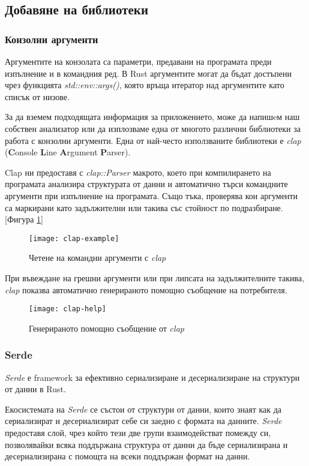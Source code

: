\subsection{Добавяне на библиотеки}

\subsubsection{Конзолни аргументи}
Аргументите на конзолата са параметри, предавани на програмата преди изпълнение
и в командния ред. В Rust аргументите могат да бъдат достъпени чрез
функцията \textit{std::env::args()}, която връща итератор над аргументите като списък от
низове.

За да вземем подходящата информация за приложението, може да напишeм наш собствен
анализатор или да изплозваме една от многото различни библиотеки за работа с
конзолни аргументи. Една от най-често използваните библиотеки е \textit{clap} (\textbf{C}onsole \textbf{L}ine
\textbf{A}rgument \textbf{P}arser).

Clap ни предоставя с \textit{clap::Parser} макрото, което при компилирането на програмата
анализира структурата от данни и автоматично търси командните аргументи при
изпълнение на програмата. Също тъка, проверява кои аргументи са маркирани като
задължителни или такива със стойност по подразбиране. [Фигура \ref{fig:clap-example}]
\begin{figure}[!htb]
  \texttt{[image: clap-example]}
  \centering
  \caption{Четене на командни аргументи с \textit{clap}}
  \label{fig:clap-example}
\end{figure}

При въвеждане на грешни аргументи или при липсата на задължителните такива, \textit{clap}
показва автоматично генерираното помощно съобщение на потребителя.
\begin{figure}[!htb]
  \texttt{[image: clap-help]}
  \centering
  \caption{Генерираното помощно съобщение от \textit{clap}}
  \label{fig:clap-help}
\end{figure}

\subsubsection{Serde}
\textit{Serde} е framework за ефективно сериализиране и десериализиране на структури от данни в Rust.

Екосистемата на \textit{Serde} се състои от структури от данни, които знаят как да
сериализират и десериализират себе си заедно с формата на данните. \textit{Serde} предоставя слой, чрез
който тези две групи взаимодействат помежду си, позволявайки всяка поддържана
структура от данни да бъде сериализирана и десериализирана с помощта на всеки
поддържан формат на данни.

